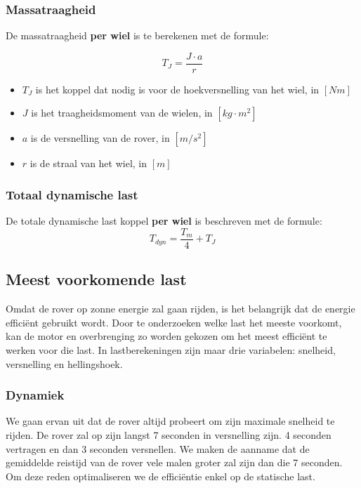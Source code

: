 \documentclass{article}
\begin{document}
            \subsubsection*{Massatraagheid}
                    

                De massatraagheid \textbf{per wiel} is te berekenen met de formule:

                \begin{equation}
                    T_{J} = \frac{J \cdot a}{r}
                \end{equation}

                \begin{itemize}
                    \item $T_{J}$ is het koppel dat nodig is voor de hoekversnelling van het wiel, in $[Nm]$
                    \item $J$ is het traagheidsmoment van de wielen, in $[kg \cdot m^2]$
                    \item $a$ is de versnelling van de rover, in $[m/s^2]$
                    \item $r$ is de straal van het wiel, in $[m]$
                \end{itemize}
                
            \subsubsection*{Totaal dynamische last}
                De totale dynamische last koppel \textbf{per wiel} is beschreven met de formule:
                \begin{equation}
                    T_{dyn} = \frac{T_{m}}{4} + T_{J}
                \end{equation}


        \subsection{Meest voorkomende last}
            Omdat de rover op zonne energie zal gaan rijden, is het belangrijk dat de energie efficiënt gebruikt wordt.
            Door te onderzoeken welke last het meeste voorkomt, 
            kan de motor en overbrenging zo worden gekozen om het meest efficiënt te werken voor die last. In lastberekeningen zijn maar drie variabelen: 
            snelheid, versnelling en hellingshoek. 
            \subsubsection*{Dynamiek}
                We gaan ervan uit dat de rover altijd probeert om zijn maximale snelheid te rijden.
                De rover zal op zijn langst 7 seconden in versnelling zijn. 4 seconden vertragen en dan 3 seconden versnellen. 
                We maken de aanname dat de gemiddelde reistijd van de rover vele malen groter zal zijn dan die 7 seconden.
                Om deze reden optimaliseren we de efficiëntie enkel op de statische last.
\end{document}

